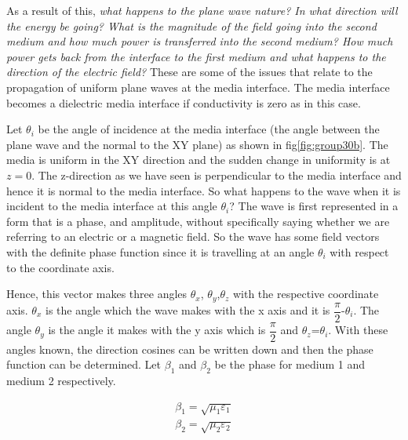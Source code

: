 As a result of this, \emph{what happens to the plane wave nature? In what direction will the energy be going? What is the magnitude of the field going into the second medium and how much power is transferred into the second medium? How much power gets back from the interface to the first medium and what happens to the direction of the electric field?} These are some of the issues that relate to the propagation of uniform plane waves at the media interface. The media interface becomes a dielectric media interface if conductivity is zero as in this case.

Let $\theta_i$ be the angle of incidence at the media interface (the angle between the plane wave and the normal to the XY plane) as shown in fig\ref{fig:group30b}. The media is uniform in the XY direction and the sudden change in uniformity is at $z=0$. The z-direction as we have seen is perpendicular to the media interface and hence it is normal to the media interface. So what happens to the wave when it is incident to the media interface at this angle $\theta_i$? The wave is first represented in a form that is a phase, and amplitude, without specifically saying whether we are referring to an electric or a magnetic field. So the wave has some field vectors with the definite phase function since it is travelling at an angle $\theta_i$ with respect to the coordinate axis.	

Hence, this vector makes three angles $\theta_x$, $\theta_y$,$\theta_z$ with the respective coordinate axis. $\theta_x$ is the angle which the wave makes with the x axis and it is $\dfrac{\pi}{2}$-$\theta_i$. The angle $\theta_y$ is the angle it makes with the y axis which is $\dfrac{\pi}{2}$ and $\theta_z$=$\theta_i$. With these angles known, the direction cosines can be written down and then the phase function can be determined. Let $\beta_1$ and $\beta_2$ be the phase for medium 1 and medium 2 respectively.

\begin{align*}
\beta_1=\sqrt{\mu_1\varepsilon_1}\\
\beta_2=\sqrt{\mu_2\varepsilon_2}  
\end{align*}
\begin{equation}\end{equation}

